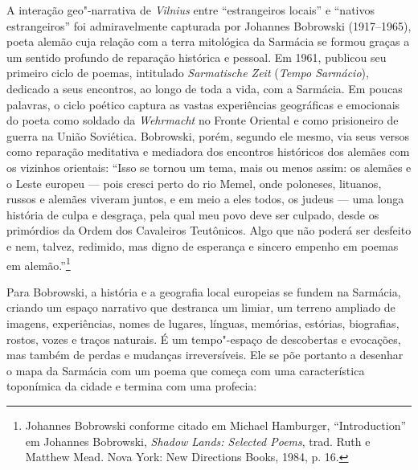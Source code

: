 A interação geo"-narrativa de \textit{Vilnius} entre ``estrangeiros locais'' e
``nativos estrangeiros'' foi admiravelmente capturada por Johannes
Bobrowski (1917--1965), poeta alemão cuja relação com a terra mitológica
da Sarmácia se formou graças a um sentido profundo de reparação
histórica e pessoal. Em 1961, publicou seu primeiro ciclo de poemas,
intitulado \textit{Sarmatische Zeit} (\textit{Tempo Sarmácio}), dedicado a
seus encontros, ao longo de toda a vida, com a Sarmácia. Em poucas
palavras, o ciclo poético captura as vastas experiências geográficas e
emocionais do poeta como soldado da \textit{Wehrmacht} no Fronte Oriental
e como prisioneiro de guerra na União Soviética. Bobrowski, porém,
segundo ele mesmo, via seus versos como reparação meditativa e mediadora
dos encontros históricos dos alemães com os vizinhos orientais: ``Isso
se tornou um tema, mais ou menos assim: os alemães e o Leste europeu ---
pois cresci perto do rio Memel, onde poloneses, lituanos, russos e
alemães viveram juntos, e em meio a eles todos, os judeus --- uma longa
história de culpa e desgraça, pela qual meu povo deve ser culpado, desde
os primórdios da Ordem dos Cavaleiros Teutônicos. Algo que não poderá
ser desfeito e nem, talvez, redimido, mas digno de esperança e sincero
empenho em poemas em alemão.''\footnote{Johannes Bobrowski conforme citado em Michael Hamburger, ``Introduction'' em Johannes Bobrowski, \textit{Shadow Lands: Selected Poems}, trad. Ruth e Matthew Mead. Nova York: New Directions Books, 1984, p. 16.}

Para Bobrowski, a história e a geografia local europeias se fundem na
Sarmácia, criando um espaço narrativo que destranca um limiar, um
terreno ampliado de imagens, experiências, nomes de lugares, línguas,
memórias, estórias, biografias, rostos, vozes e traços naturais. É um
tempo"-espaço de descobertas e evocações, mas também de perdas e mudanças
irreversíveis. Ele se põe portanto a desenhar o mapa da Sarmácia com um
poema que começa com uma característica toponímica da cidade e termina
com uma profecia:

